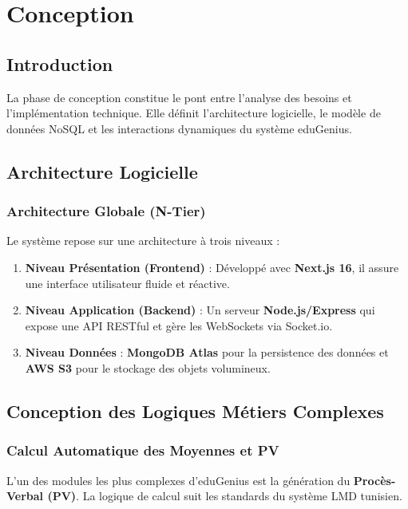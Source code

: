 \chapter{Conception}

\section{Introduction}
La phase de conception constitue le pont entre l'analyse des besoins et l'implémentation technique. Elle définit l'architecture logicielle, le modèle de données NoSQL et les interactions dynamiques du système eduGenius.

\section{Architecture Logicielle}
\subsection{Architecture Globale (N-Tier)}
Le système repose sur une architecture à trois niveaux :
\begin{enumerate}
    \item \textbf{Niveau Présentation (Frontend)} : Développé avec \textbf{Next.js 16}, il assure une interface utilisateur fluide et réactive.
    \item \textbf{Niveau Application (Backend)} : Un serveur \textbf{Node.js/Express} qui expose une API RESTful et gère les WebSockets via Socket.io.
    \item \textbf{Niveau Données} : \textbf{MongoDB Atlas} pour la persistence des données et \textbf{AWS S3} pour le stockage des objets volumineux.
\end{enumerate}
\section{Conception des Logiques Métiers Complexes}
\subsection{Calcul Automatique des Moyennes et PV}
L'un des modules les plus complexes d'eduGenius est la génération du \textbf{Procès-Verbal (PV)}. La logique de calcul suit les standards du système LMD tunisien.

